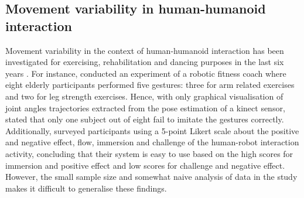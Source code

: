 \subsection{Movement variability in human-humanoid interaction}
Movement variability in the context of human-humanoid interaction 
has been investigated for exercising, rehabilitation and dancing 
purposes in the last six years
\citep{gorer2013, guneysu2014, guneysu2015, tsuchida2013, peng2015}.
For instance, \cite{gorer2013} conducted an experiment of a robotic 
fitness coach 
where eight elderly participants performed five gestures: 
three for arm related exercises and two for leg strength exercises. 
Hence, \cite{gorer2013} with only graphical 
visualisation of joint angles trajectories extracted from the pose 
estimation of a kinect sensor, stated that only one subject out of 
eight fail to imitate the gestures correctly.
Additionally, \cite{gorer2013} surveyed 
participants using a 5-point Likert scale about the positive and 
negative effect, flow, immersion and challenge of the human-robot 
interaction activity, concluding that their system is easy to use 
based on the high scores for immersion and 
positive effect and low scores for challenge and negative effect.
However, the small sample size and somewhat naive analysis of data
in the study makes it difficult to generalise these findings.

